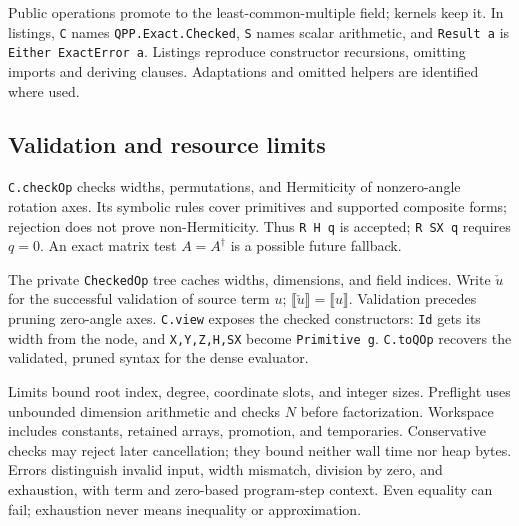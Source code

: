 \documentclass[11pt,a4paper]{article}
\newcommand{\sem}[1]{\llbracket #1\rrbracket}
\newcommand{\code}[1]{\texttt{#1}}
\begin{document}
Public operations promote to the least-common-multiple field; kernels
keep it. In listings, \code{C} names \code{QPP.Exact.Checked}, \code{S}
names scalar arithmetic, and \code{Result a} is \code{Either ExactError a}.
Listings reproduce constructor recursions, omitting imports and deriving
clauses. Adaptations and omitted helpers are identified where used.

\subsection{Validation and resource limits}
\code{C.checkOp} checks widths, permutations, and Hermiticity of nonzero-angle
rotation axes. Its symbolic rules cover primitives and supported composite
forms; rejection does not prove non-Hermiticity. Thus \code{R H q} is
accepted; \code{R SX q} requires $q=0$. An exact matrix test
$A=A^\dagger$ is a possible future fallback.

The private \code{CheckedOp} tree caches widths, dimensions, and field indices.
Write $\check u$ for the successful validation of source term $u$;
$\sem{\check u}=\sem u$. Validation precedes pruning zero-angle axes.
\code{C.view} exposes the checked constructors: \code{Id} gets its width
from the node, and \code{X,Y,Z,H,SX} become \code{Primitive g}.
\code{C.toQOp} recovers the validated, pruned syntax for the dense evaluator.

Limits bound root index, degree, coordinate slots, and integer sizes.
Preflight uses unbounded dimension arithmetic and checks $N$ before
factorization. Workspace includes constants, retained arrays, promotion,
and temporaries. Conservative checks may reject later cancellation;
they bound neither wall time nor heap bytes. Errors distinguish invalid
input, width mismatch, division by zero, and exhaustion, with term and
zero-based program-step context. Even equality can fail; exhaustion
never means inequality or approximation.
\end{document}
